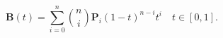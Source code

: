 \documentclass[border=2pt,varwidth]{standalone}
\begin{document}
\[
  \mathbf{B}(t)=\sum_{i=0}^n \binom{n}{i} \mathbf{P}_i (1-t)^{n-i} t^i
  \quad t \in [ 0, 1 ].
\]
\end{document}

